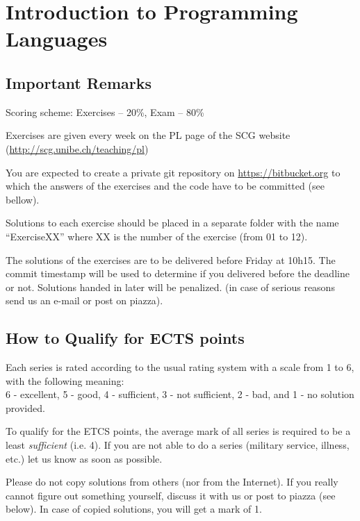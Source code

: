 \documentclass [11pt, a4wide, twoside]{article}
\begin{document}
\section*{\space{} Introduction to Programming Languages}


\subsection*{Important Remarks}
\begin{myitemize}
\item Scoring scheme: Exercises -- 20\%, Exam -- 80\%
\item Exercises are given every week on the PL page of the SCG website \\ (\url{http://scg.unibe.ch/teaching/pl})
\item You are expected to create a private git repository on
\url{https://bitbucket.org} to which the answers of the exercises and the code
have to be committed (see bellow). 
\item Solutions to each exercise should be placed in a separate folder with the name ``ExerciseXX'' where XX is the number of the exercise (from 01 to 12).
\item The solutions of the exercises are to be delivered before Friday at 10h15. The commit timestamp will be used to determine if you delivered before the deadline or not. Solutions handed in later will be penalized. (in case of serious reasons send us an e-mail or post on piazza).
\end{myitemize}

\subsection*{How to Qualify for ECTS points}
\begin{myitemize}
\item Each series is rated according to the usual rating system with a scale from 1 to 6, with the following meaning: \\
6 - excellent, 5 - good, 4 - sufficient, 3 - not sufficient, 2 - bad, and 1 - no solution provided.
\item To qualify for the ETCS points, the average mark of all series is required to be a least \emph{sufficient} (i.e. 4). If you are not able to do a series (military service, illness, etc.) let us know as soon as possible.
\item Please do not copy solutions from others (nor from the Internet). If you really cannot figure out something yourself, discuss it with us or post to piazza (see below). In case of copied solutions, you will get a mark of 1.
\end{myitemize}
\end{document}
